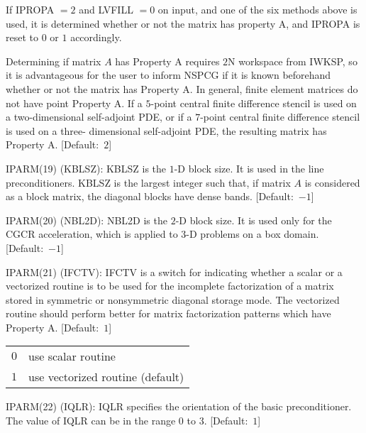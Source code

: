 \begin{list}{}{
               \leftmargin 1.00in \rightmargin 0.25in}
         If IPROPA $= 2$ and LVFILL $= 0$ on input, and one of the
         six methods above is used, it is determined whether or
         not the matrix has property A, and IPROPA is reset to
         $0$ or $1$ accordingly.
 
         Determining if matrix $A$ has Property A requires $2$N
         workspace from IWKSP, so it is advantageous for the
         user to inform NSPCG if it is known beforehand whether
         or not the matrix has Property A.  In general, finite
         element matrices do not have point Property A.  If a
         $5$-point central finite difference stencil is used on
         a two-dimensional self-adjoint PDE, or if a $7$-point
         central finite difference stencil is used on a three-
         dimensional self-adjoint PDE, the resulting matrix has
         Property A.  \mbox{[Default: $2$]}
 
\item[IPARM(19) \hfill](KBLSZ):
         KBLSZ is the $1$-D block size.  It is used in the
         line preconditioners.  KBLSZ is the largest integer such
         that, if matrix $A$ is considered as a block matrix,
         the diagonal blocks have dense bands.  \mbox{[Default: $-1$]}
 
\item[IPARM(20) \hfill](NBL2D):
         NBL2D is the $2$-D block size.  It is used only for the
         CGCR acceleration, which is applied to $3$-D problems on
         a box domain.  \mbox{[Default: $-1$]}
 
\item[IPARM(21) \hfill](IFCTV):
         IFCTV is a switch for indicating whether a scalar or a
         vectorized routine is to be used for the incomplete
         factorization of a matrix stored in symmetric or
         nonsymmetric diagonal storage mode.  The vectorized
         routine should perform better for matrix factorization
         patterns which have Property A.  \mbox{[Default: $1$]}
 
         \begin{tabular}{ll}
           $0$ & use scalar routine \\
           $1$ & use vectorized routine (default) \\
         \end{tabular}
 
\item[IPARM(22) \hfill](IQLR):
         IQLR specifies the orientation of the basic preconditioner.
         The value of IQLR can be in the range $0$ to $3$.
         \mbox{[Default: $1$]}
 

\end{list}
